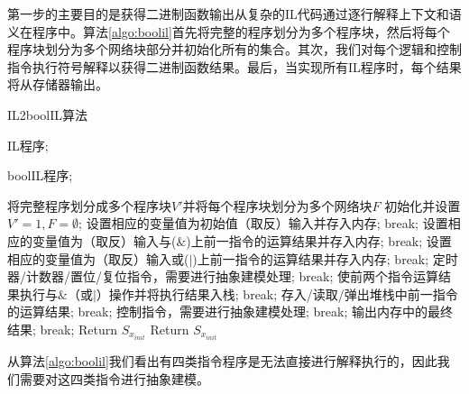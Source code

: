 第一步的主要目的是获得二进制函数输出从复杂的IL代码通过逐行解释上下文和语义在程序中。算法\ref{algo:boolil}首先将完整的程序划分为多个程序块，然后将每个程序块划分为多个网络块部分并初始化所有的集合。其次，我们对每个逻辑和控制指令执行符号解释以获得二进制函数结果。最后，当实现所有IL程序时，每个结果将从存储器输出。

\begin{algorithm}[!htb]
\caption{IL2boolIL算法}
\label{algo:boolil}
\begin{algorithmic}[1]
\Require %
IL程序;

\Ensure %
boolIL程序;  

\State 将完整程序划分成多个程序块$V'$并将每个程序块划分为多个网络块$F$
\State 初始化并设置$V'= 1,F=\emptyset$;
\State 设置相应的变量值为初始值（取反）输入并存入内存; break;
\EndCase
{}
\State 设置相应的变量值为（取反）输入与($\&$)上前一指令的运算结果并存入内存; break;
\EndCase
{}
\State 设置相应的变量值为（取反）输入或($|$)上前一指令的运算结果并存入内存; break;
\EndCase
{}
\State 定时器/计数器/置位/复位指令，需要进行抽象建模处理; break;
\EndCase
\EndSwitch
\EndFor
\EndCase
{}
\State 使前两个指令运算结果执行与$\&$（或$|$）操作并将执行结果入栈; break;
\EndCase
{}
\State 存入/读取/弹出堆栈中前一指令的运算结果; break;
\EndCase
{}
\State 控制指令，需要进行抽象建模处理; break;
\EndCase
\Case {$=$}
\State 输出内存中的最终结果; break;
\EndCase
\Default
\State Return $S_{x_{init}}$
\EndDefault
\EndSwitch
\EndFor
\State Return $S_{x_{init}}$
\end{algorithmic}
\end{algorithm}

从算法\ref{algo:boolil}我们看出有四类指令程序是无法直接进行解释执行的，因此我们需要对这四类指令进行抽象建模。

